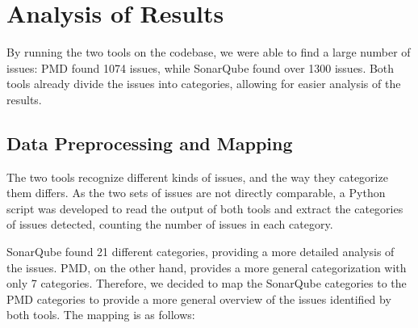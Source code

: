 \section{Analysis of Results}

By running the two tools on the codebase, we were able to find a large number of issues: PMD found 1074 issues, while SonarQube found over 1300 issues. Both tools already divide the issues into categories, allowing for easier analysis of the results.

\subsection{Data Preprocessing and Mapping}
\label{sec:data_preprocessing}

The two tools recognize different kinds of issues, and the way they categorize them differs. As the two sets of issues are not directly comparable, a Python script was developed to read the output of both tools and extract the categories of issues detected, counting the number of issues in each category.

SonarQube found 21 different categories, providing a more detailed analysis of the issues. PMD, on the other hand, provides a more general categorization with only 7 categories. Therefore, we decided to map the SonarQube categories to the PMD categories to provide a more general overview of the issues identified by both tools. The mapping is as follows:

